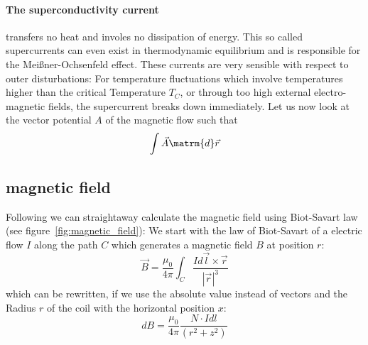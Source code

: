 \paragraph{The superconductivity current} transfers no heat and involes
 no dissipation of energy. This 
so called supercurrents can even exist in thermodynamic equilibrium and
is responsible for the Meißner-Ochsenfeld effect. These currents are very
sensible with respect to outer disturbations: For temperature fluctuations
which involve temperatures higher than the critical Temperature $T_C$, 
or through too high external electro-magnetic fields, the supercurrent
breaks down immediately. Let us now look at the vector potential $A$ of the 
magnetic flow such that
\begin{equation}
\int \vec{A} \matrm{d} \vec{r}
\end{equation} 
\subsection{magnetic field}
Following we can straightaway calculate the magnetic field using
Biot-Savart law (see figure~\ref{fig:magnetic_field}):
We start with the law of Biot-Savart of a electric flow $I$ along the path $C$ which generates
a magnetic field $B$ at position $r$:
\begin{equation}
    \vec{B} = \frac{\mu_0}{4\pi} \int_{C} \frac{I d\vec{l} \times \vec{r}}{|\vec{r}|^3} 
\end{equation}
which can be rewritten, if we use the absolute value instead of vectors and the Radius $r$ of the
coil with the horizontal position $x$:
\begin{equation}
    dB = \frac{\mu_0}{4\pi} \frac{N \cdot I dl}{(r^2 + z^2)} 
\end{equation}

